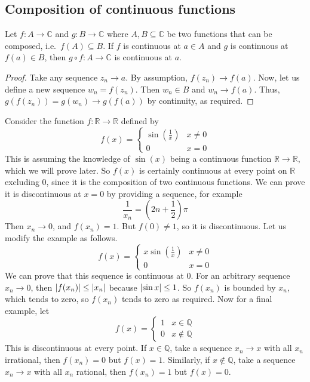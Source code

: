 \subsection{Composition of continuous functions}
\begin{theorem}
	Let \(f \colon A \to \mathbb C\) and \(g \colon B \to \mathbb C\) where \(A, B \subseteq \mathbb C\) be two functions that can be composed, i.e.\ \(f(A) \subseteq B\).
	If \(f\) is continuous at \(a \in A\) and \(g\) is continuous at \(f(a) \in B\), then \(g \circ f \colon A \to \mathbb C\) is continuous at \(a\).
\end{theorem}
\begin{proof}
	Take any sequence \(z_n \to a\).
	By assumption, \(f(z_n) \to f(a)\).
	Now, let us define a new sequence \(w_n = f(z_n)\).
	Then \(w_n \in B\) and \(w_n \to f(a)\).
	Thus, \(g(f(z_n)) = g(w_n) \to g(f(a))\) by continuity, as required.
\end{proof}
\noindent Consider the function \(f\colon \mathbb R \to \mathbb R\) defined by
\[
	f(x) = \begin{cases}
		\sin\left( \frac{1}{x} \right) & x \neq 0 \\
		0                              & x = 0
	\end{cases}
\]
This is assuming the knowledge of \(\sin(x)\) being a continuous function \(\mathbb R\to \mathbb R\), which we will prove later.
So \(f(x)\) is certainly continuous at every point on \(\mathbb R\) excluding 0, since it is the composition of two continuous functions.
We can prove it is discontinuous at \(x=0\) by providing a sequence, for example
\[
	\frac{1}{x_n} = \left(2n + \frac{1}{2}\right)\pi
\]
Then \(x_n \to 0\), and \(f(x_n) = 1\).
But \(f(0) \neq 1\), so it is discontinuous.
Let us modify the example as follows.
\[
	f(x) = \begin{cases}
		x\sin\left( \frac{1}{x} \right) & x \neq 0 \\
		0                               & x = 0
	\end{cases}
\]
We can prove that this sequence is continuous at 0.
For an arbitrary sequence \(x_n \to 0\), then \(\abs{f(x_n)} \leq \abs{x_n}\) because \(\abs{\sin x} \leq 1\).
So \(f(x_n)\) is bounded by \(x_n\), which tends to zero, so \(f(x_n)\) tends to zero as required.
Now for a final example, let
\[
	f(x) = \begin{cases}
		1 & x \in \mathbb Q    \\
		0 & x \notin \mathbb Q
	\end{cases}
\]
This is discontinuous at every point.
If \(x \in \mathbb Q\), take a sequence \(x_n \to x\) with all \(x_n\) irrational, then \(f(x_n) = 0\) but \(f(x) = 1\).
Similarly, if \(x \notin \mathbb Q\), take a sequence \(x_n \to x\) with all \(x_n\) rational, then \(f(x_n) = 1\) but \(f(x) = 0\).

